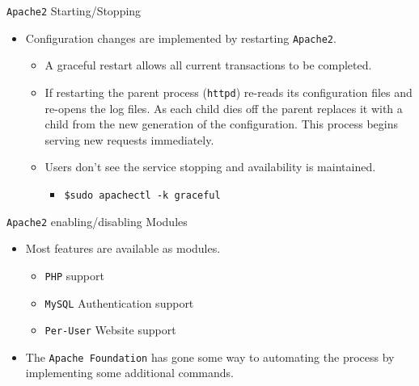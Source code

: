 \documentclass[xcolor=table]{beamer}
\begin{document}
\begin{frame}{\texttt{Apache2} Starting/Stopping}
  \begin{itemize}
    \item Configuration changes are implemented by restarting \texttt{Apache2}.
      \begin{itemize}
        \item A graceful restart allows all current transactions to be completed. 
        \item If restarting the parent process (\texttt{httpd}) re-reads its configuration files and re-opens the log files. As each child dies off the parent replaces it with a child from the new generation of the configuration. This process begins serving new requests immediately.
        \item Users don't see the service stopping and availability is maintained.
          \begin{itemize}
            \item \texttt{\$sudo apachectl -k graceful}
          \end{itemize}
      \end{itemize}
    \end{itemize}
\end{frame}

\begin{frame}{\texttt{Apache2} enabling/disabling Modules}
  \begin{itemize}
    \item Most features are available as modules.
      \begin{itemize}
        \item \texttt{PHP} support
        \item \texttt{MySQL} Authentication support
        \item \texttt{Per-User} Website support
      \end{itemize}
    \item The \texttt{Apache Foundation} has gone some way to automating the process by implementing some additional commands.
  \end{itemize}
\end{frame}
\end{document}
